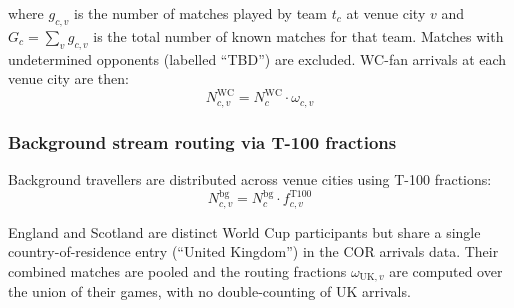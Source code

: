 \documentclass[12pt]{article}
\begin{document}
where $g_{c,v}$ is the number of matches played by team $t_c$ at
venue city $v$ and $G_c = \sum_v g_{c,v}$ is the total number of
known matches for that team. Matches with undetermined opponents
(labelled ``TBD'') are excluded. WC-fan arrivals at each venue city
are then:
\begin{equation}
  N_{c,v}^{\text{WC}} = N_c^{\text{WC}} \cdot \omega_{c,v}
\end{equation}

\subsubsection*{Background stream routing via T-100 fractions}

Background travellers are distributed across venue cities using T-100
fractions:
\begin{equation}
  N_{c,v}^{\text{bg}} = N_c^{\text{bg}} \cdot f_{c,v}^{\text{T100}}
\end{equation}

England and Scotland are distinct World Cup participants but share a
single country-of-residence entry (``United Kingdom'') in the COR
arrivals data. Their combined matches are pooled and the routing
fractions $\omega_{\text{UK},v}$ are computed over the union of their
games, with no double-counting of UK arrivals.
\end{document}
